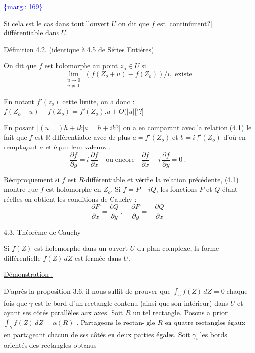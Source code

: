 \documentclass[11pt]{article}
\newcommand{\scanpage}[1]{\par\bigskip\noindent{\small\sffamily[scan #1]}\par}
\newcommand{\mspage}[1]{{\small\sffamily[p.\,#1]}}
\newcommand{\margin}[1]{\textcolor{blue}{\{\textsf{marg.:} #1\}}}
\newcommand{\uline}[1]{\underline{#1}}
\newcommand{\unsure}[1]{[#1?]}
\begin{document}
\margin{169}

\clearpage
\scanpage{119/170}
\mspage{- 9 -}

Si cela est le cas dans tout l'ouvert  $U$  on dit que  $f$  est \unsure{continûment}
différentiable dans  $U$.

\uline{Définition 4.2.}  (identique à 4.5 de Séries  Entières)

On dit que  $f$  est holomorphe au point  $z_o \in U$  si
\[ \lim_{\substack{u\to 0\\ u\neq 0}} \ (f(Z_o+u) - f(Z_o))/u \ \text{ existe} \]

En notant  $f'(z_o)$  cette limite, on a donc :  $f(Z_o+u)-f(Z_o) = f'(Z_o).u + O(|u|$\unsure{$^\circ$}

En posant  \unsure{$(u =)h + ik$|$u = h + ik$}  on a en comparant avec la relation  (4.1)  le fait
que  $f$  est $\mathbb{R}$-différentiable avec de plus  $a = f'(Z_o)$ et $b = i\, f'(Z_o)$
d'où en remplaçant  $a$ et $b$  par leur valeurs :
\[ \frac{\partial f}{\partial y} = i\,\frac{\partial f}{\partial x} \quad \text{ou encore} \quad \frac{\partial f}{\partial x} + i\,\frac{\partial f}{\partial y} = 0 \ . \]

Réciproquement si  $f$  est  $R$-différentiable et vérifie la relation précédente,
(4.1) montre que  $f$  est holomorphe en  $Z_o$. Si  $f = P + iQ$, les fonctions
$P$ et $Q$  étant réelles on obtient les conditions de Cauchy :
\[ \frac{\partial P}{\partial x} = \frac{\partial Q}{\partial y} \ , \quad \frac{\partial P}{\partial y} = -\frac{\partial Q}{\partial x} \]

\uline{4.3. Théorème de Cauchy}

Si  $f(Z)$  est holomorphe dans un ouvert  $U$  du plan complexe, la
forme différentielle  $f(Z)\, dZ$  est fermée dans  $U$.

\uline{Démonstration :}

D'après la proposition 3.6. il nous suffit de prouver que
$\int_\gamma f(Z)\, dZ = 0$  chaque fois que  $\gamma$  est le bord d'un rectangle contenu (ainsi
que son intérieur) dans  $U$  et ayant ses côtés parallèles aux axes. Soit  $R$
un tel rectangle. Posons a priori  $\int_\gamma f(Z)\, dZ = \alpha(R)$ . Partageons le rectan-%
gle  $R$  en quatre rectangles égaux en partageant chacun de ses côtés en
deux parties égales. Soit  $\gamma_i$  les bords orientés des rectangles obtenus
\end{document}

